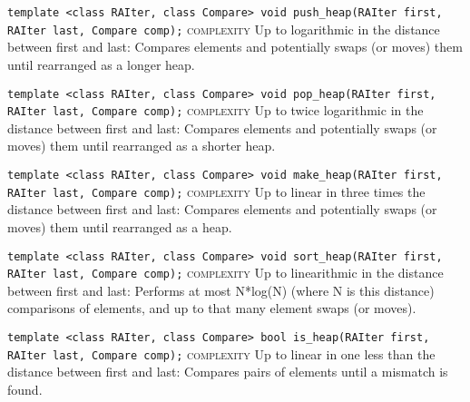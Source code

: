 \noindent{}\hspace*{0.25em}\lstinline[basicstyle=\ttfamily\color{clime}]{template <class RAIter, class Compare> void push_heap(RAIter first, RAIter last, Compare comp);} \textsc{complexity} Up to logarithmic in the distance between first and last: Compares elements and potentially swaps (or moves) them until rearranged as a longer heap.\\\vspace{-0.6em}

\noindent{}\hspace*{0.25em}\lstinline[basicstyle=\ttfamily\color{clime}]{template <class RAIter, class Compare> void pop_heap(RAIter first, RAIter last, Compare comp);} \textsc{complexity} Up to twice logarithmic in the distance between first and last: Compares elements and potentially swaps (or moves) them until rearranged as a shorter heap.\\\vspace{-0.6em}

\noindent{}\hspace*{0.25em}\lstinline[basicstyle=\ttfamily\color{corange}]{template <class RAIter, class Compare> void make_heap(RAIter first, RAIter last, Compare comp);} \textsc{complexity} Up to linear in three times the distance between first and last: Compares elements and potentially swaps (or moves) them until rearranged as a heap.\\\vspace{-0.6em}

\noindent{}\hspace*{0.25em}\lstinline[basicstyle=\ttfamily\color{cred}]{template <class RAIter, class Compare> void sort_heap(RAIter first, RAIter last, Compare comp);} \textsc{complexity} Up to linearithmic in the distance between first and last: Performs at most N*log(N) (where N is this distance) comparisons of elements, and up to that many element swaps (or moves).\\\vspace{-0.6em}

\noindent{}\hspace*{0.25em}\lstinline[basicstyle=\ttfamily\color{corange}]{template <class RAIter, class Compare> bool is_heap(RAIter first, RAIter last, Compare comp);} \textsc{complexity} Up to linear in one less than the distance between first and last: Compares pairs of elements until a mismatch is found.\\\vspace{-0.6em}


